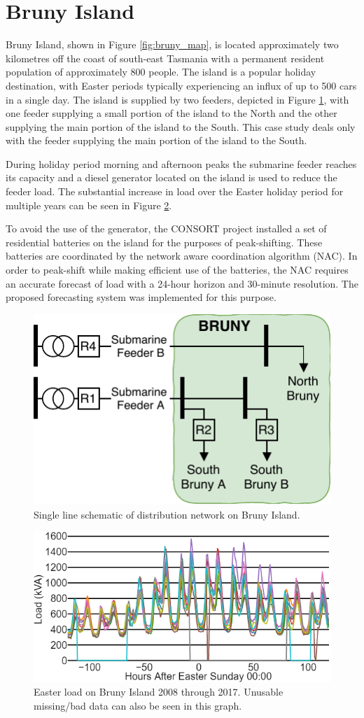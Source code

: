 \section{Bruny Island}
Bruny Island, shown in Figure \ref{fig:bruny_map}, is located approximately two kilometres off the coast of south-east Tasmania with a permanent resident population of approximately 800 people.
The island is a popular holiday destination, with Easter periods typically experiencing an influx of up to 500 cars in a single day.
The island is supplied by two feeders, depicted in Figure \ref{fig:bruny_network}, with  one feeder supplying a small portion of the island to the North and the other supplying the main portion of the island to the South.
This case study deals only with the feeder supplying the main portion of the island to the South.

During holiday period morning and afternoon peaks the submarine feeder reaches its capacity and a diesel generator located on the island is used to reduce the feeder load.
The substantial increase in load over the Easter holiday period for multiple years can be seen in Figure \ref{fig:bruny_easter}.

To avoid the use of the generator, the CONSORT project installed a set of residential batteries on the island for the purposes of peak-shifting.
These batteries are coordinated by the network aware coordination algorithm (NAC).
In order to peak-shift while making efficient use of the batteries, the NAC requires an accurate forecast of load with a 24-hour horizon and 30-minute resolution.
The proposed forecasting system was implemented for this purpose.

\begin{figure}[htbp]
	\centerline{\includegraphics[width=.25\textwidth]{images/bruny_single_line.pdf}}
	\caption{Single line schematic of distribution network on Bruny Island.}
	\label{fig:bruny_network}
\end{figure}

\begin{figure}[htbp]
	\centerline{\includegraphics[width=.40\textwidth]{images/easter_bruny.png}}
	\caption{Easter load on Bruny Island 2008 through 2017.
		Unusable missing/bad data can also be seen in this graph.}
	\label{fig:bruny_easter}
\end{figure}

